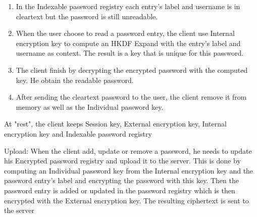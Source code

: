 \documentclass[../report.tex]{subfiles}
\begin{document}
\begin{enumerate}
 \item In the Indexable password registry each entry's label and username is in cleartext but the password is still unreadable. 
 \item When the user choose to read a password entry, the client use Internal encryption key to compute an HKDF Expand with the entry's label and username as context. The result is a key that is unique for this password.
 \item The client finish by decrypting the encrypted password with the computed key. He obtain the readable password.
 \item After sending the cleartext password to the user, the client remove it from memory as well as the Individual password key.
\end{enumerate}

At "rest", the client keeps Session key, External encryption key, Internal encryption key and Indexable password registry

Upload:
When the client add, update or remove a password, he needs to update his Encrypted password registry and upload it to the server. This is done by computing an Individual password key from the Internal encryption key and the password entry's label and encrypting the password with this key. Then the password entry is added or updated in the password registry which is then encrypted with the External encryption key. The resulting ciphertext is sent to the server
\end{document}
